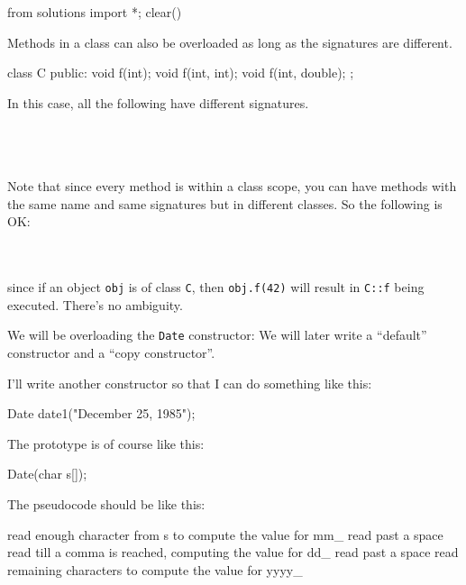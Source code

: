 \begin{python0}
from solutions import *; clear()
\end{python0}

Methods in a class can also be overloaded as long as the signatures are
different.

\begin{consolethree}[escapeinside=||]
class C
{
public:
    void f(int);
    void f(int, int);
    void f(int, double);
};
\end{consolethree}

In this case, all the following have different signatures.

\\

\\

\\

Note that since every method is within a class scope, you can have
methods with the same name and same signatures but in different classes.
So the following is OK:

\\

\\

since if an object \texttt{obj} is of class \texttt{C}, then
\texttt{obj.f(42)} will result in \texttt{C::f} being executed. There's no
ambiguity.

We will be overloading the \texttt{Date} constructor: We will later write
a ``default'' constructor and a ``copy constructor''.

I'll write another constructor so that I can do something like this:

\begin{consolethree}[escapeinside=||]
Date date1("December 25, 1985");
\end{consolethree}

The prototype is of course like this:

\begin{consolethree}[escapeinside=||]
Date(char s[]);
\end{consolethree}

The pseudocode should be like this:

\begin{consolethree}[escapeinside=||]
read enough character from s to compute the value for mm_
read past a space
read till a comma is reached, computing the value for dd_
read past a space
read remaining characters to compute the value for yyyy_
\end{consolethree}

